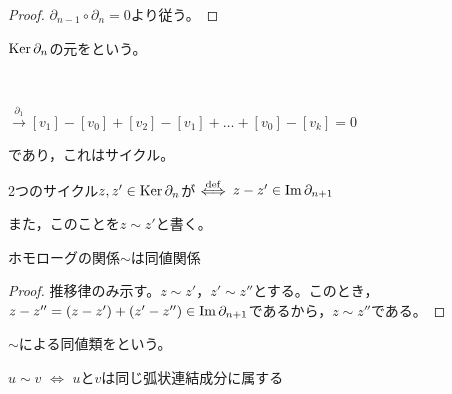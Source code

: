 \documentclass[uplatex]{jsarticle}
\begin{document}
\begin{proof}
  $\partial_{n-1} \circ \partial_{n} = 0$より従う。
\end{proof}

\begin{teigi}[サイクル]
  $\operatorname{Ker} \partial_{n}$の元をという。
\end{teigi}

\begin{rei}[サイクルのイメージ]　\\

  $\xrightarrow{\partial_{1}} [v_{1}] - [v_{0}] + [v_{2}] - [v_{1}] + \dots + [v_{0}] - [v_{k}] = 0$
  
  であり，これはサイクル。
\end{rei}

\begin{teigi}[ホモローグ]
  2つのサイクル$z, z' \in \operatorname{Ker} \partial_{n}$が $\overset{\mathrm{def}}{\Longleftrightarrow}$ $z - z' \in \operatorname{Im} \partial_{n+1}$

  また，このことを$z \sim z'$と書く。
\end{teigi}

\begin{hodai}
  ホモローグの関係$\sim$は同値関係
\end{hodai}

\begin{proof}
  推移律のみ示す。$z \sim z'$，$z' \sim z''$とする。このとき，$z - z'' = (z - z') + (z' - z'') \in \operatorname{Im} \partial_{n+1}$であるから，$z \sim z''$である。
\end{proof}

$\sim$による同値類をという。

\begin{rei}[ホモローグのイメージ]
\end{rei}

\begin{hodai}
  $u \sim v$ $\Longleftrightarrow$ $u$と$v$は同じ弧状連結成分に属する
\end{hodai}
\end{document}
